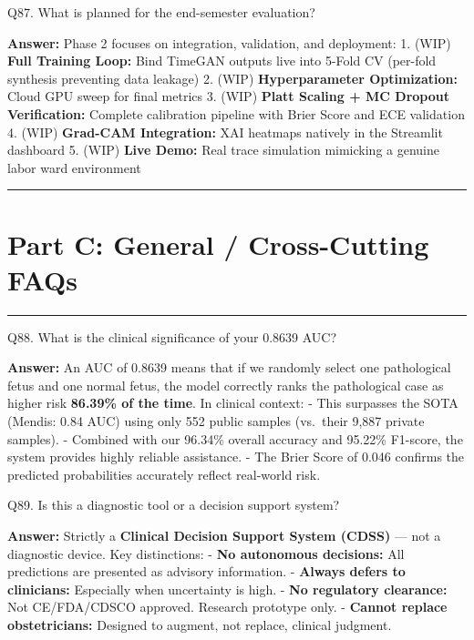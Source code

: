 \documentclass[11pt,a4paper]{article}
\begin{document}
\begin{questionbox}
Q87. What is planned for the end-semester evaluation?
\end{questionbox}
\textbf{Answer:} Phase 2 focuses on integration, validation, and deployment:
1. (WIP) \textbf{Full Training Loop:} Bind TimeGAN outputs live into 5-Fold
CV (per-fold synthesis preventing data leakage) 2. (WIP)
\textbf{Hyperparameter Optimization:} Cloud GPU sweep for final metrics
3. (WIP) \textbf{Platt Scaling + MC Dropout Verification:} Complete
calibration pipeline with Brier Score and ECE validation 4. (WIP)
\textbf{Grad-CAM Integration:} XAI heatmaps natively in the Streamlit
dashboard 5. (WIP) \textbf{Live Demo:} Real trace simulation mimicking a
genuine labor ward environment

\begin{center}\rule{0.5\linewidth}{0.5pt}\end{center}

\section{Part C: General / Cross-Cutting
FAQs}\label{part-c-general-cross-cutting-faqs}

\begin{center}\rule{0.5\linewidth}{0.5pt}\end{center}

\begin{questionbox}
Q88. What is the clinical significance of your 0.8639 AUC?
\end{questionbox}
\textbf{Answer:} An AUC of 0.8639 means that if we randomly select one
pathological fetus and one normal fetus, the model correctly ranks the
pathological case as higher risk \textbf{86.39\% of the time}. In
clinical context: - This surpasses the SOTA (Mendis: 0.84 AUC) using
only 552 public samples (vs.~their 9,887 private samples). - Combined
with our 96.34\% overall accuracy and 95.22\% F1-score, the system
provides highly reliable assistance. - The Brier Score of 0.046 confirms
the predicted probabilities accurately reflect real-world risk.

\begin{questionbox}
Q89. Is this a diagnostic tool or a decision support system?
\end{questionbox}
\textbf{Answer:} Strictly a \textbf{Clinical Decision Support System (CDSS)}
--- not a diagnostic device. Key distinctions: - \textbf{No autonomous
decisions:} All predictions are presented as advisory information. -
\textbf{Always defers to clinicians:} Especially when uncertainty is
high. - \textbf{No regulatory clearance:} Not CE/FDA/CDSCO approved.
Research prototype only. - \textbf{Cannot replace obstetricians:}
Designed to augment, not replace, clinical judgment.
\end{document}
